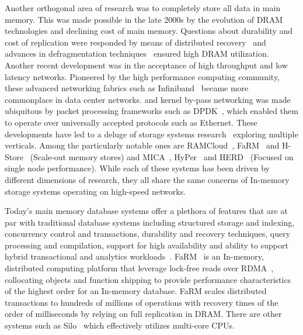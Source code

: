 Another orthogonal area of research was to completely store all data in main memory.
This was made possible in the late 2000s by the evolution of DRAM technologies and declining cost of main memory.
Questions about durability and cost of replication 
were responded by means of distributed recovery~\cite{ongaro2011fast} and advances in defragmentation techniques~\cite{ramcloudfast} 
ensured high DRAM utilization. Another recent development was in the acceptance of high throughput and low latency networks. 
Pioneered by the high performance computing community, these advanced networking fabrics 
such as Infiniband~\cite{pfister2001introduction} became more commonplace in 
data center networks. and kernel by-pass networking was made ubiquitous by packet processing 
frameworks such as DPDK~\cite{dpdk}, which enabled them to operate over universally accepted protocols
such as Ethernet. These developments have led to a deluge of storage systems research~\cite{mmdbmstutorial} 
exploring multiple verticals. Among the particularly notable ones are RAMCloud~\cite{ramcloud},
FaRM~\cite{farm} and H-Store~\cite{hstore} (Scale-out memory stores) and
MICA~\cite{mica}, HyPer~\cite{hyper} and HERD~\cite{herd} (Focused on single node performance).
While each of these systems has been driven by different dimensions 
of research, they all share the same concerns of In-memory storage systems 
operating on high-speed networks.

Today's main memory database systems offer a plethora of features that are at par with traditional
database systems including structured storage and indexing, concurrency control and transactions,
 durability and recovery techniques, query processing and compilation, support for high availability and 
ability to support hybrid transactional and analytics workloads~\cite{mmdbmstutorial}.
FaRM~\cite{farm} is an In-memory, distributed computing platform that leverage lock-free reads over RDMA~\cite{rdma},
collocating objects and function shipping to provide performance characteristics of the 
highest order for an In-memory database. FaRM scales distributed transactions to
hundreds of millions of operations with recovery times of the order of milliseconds by relying on 
full replication in DRAM. There are other systems such as Silo~\cite{silo} which effectively utilizes multi-core CPUs.

